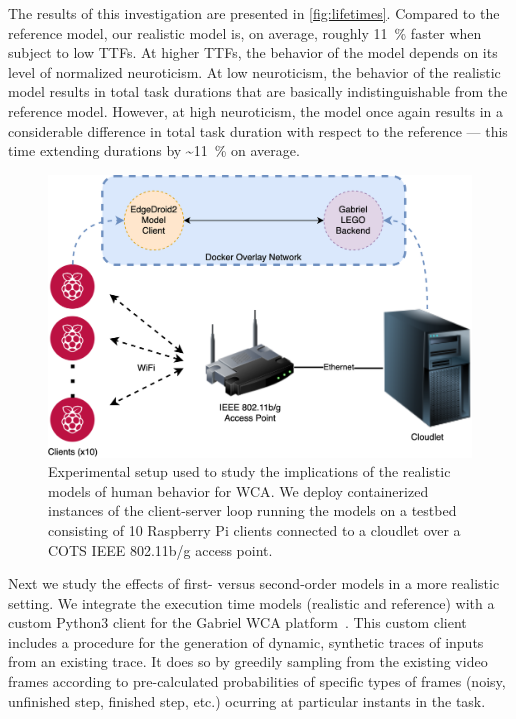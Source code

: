 The results of this investigation are presented in \cref{fig:lifetimes}.
Compared to the reference model, our realistic model is, on average, roughly \SI{11}{\percent} faster when subject to low \glspl{TTF}.
At higher \glspl{TTF}, the behavior of the model depends on its level of normalized neuroticism.
At low neuroticism, the behavior of the realistic model results in total task durations that are basically indistinguishable from the reference model.
However, at high neuroticism, the model once again results in a considerable difference in total task duration with respect to the reference --- this time extending durations by \textasciitilde\SI{11}{\percent} on average.

\begin{figure}
    \centering
    \includegraphics[width=.9\columnwidth]{figs/EdgeDroid2ExperimentalSetup}
    \caption{%
        Experimental setup used to study the implications of the realistic models of human behavior for \gls{WCA}.
        We deploy containerized instances of the client-server loop running the models on a testbed consisting of \num{10} Raspberry Pi clients connected to a cloudlet over a \gls{COTS} \gls{IEEE} \num{802.11}b/g access point.
    }\label{fig:expsetup}
\end{figure}

Next we study the effects of first- versus second-order models in a more realistic setting.
We integrate the execution time models (realistic and reference) with a custom Python3 client for the Gabriel \gls{WCA} platform~\cite{chen2018application}.
This custom client includes a procedure for the generation of dynamic, synthetic traces of inputs from an existing trace.
It does so by greedily sampling from the existing video frames according to pre-calculated probabilities of specific types of frames (noisy, unfinished step, finished step, etc.) ocurring at particular instants in the task.

